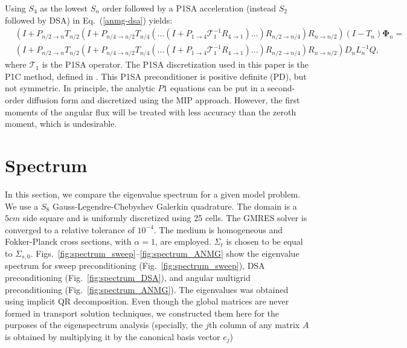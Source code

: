 \documentclass[preprint,10pt]{elsarticle}
\newcommand\bs{\boldsymbol}
\renewcommand{\(}{\left(}
\renewcommand{\)}{\right)}
\renewcommand{\[}{\left[}
\renewcommand{\]}{\right]}
\newcommand{\eqt}[1]{Eq.~(\ref{#1})}                     %
\newcommand{\fig}[1]{Fig.~\ref{#1}}                      %
\begin{document}
Using $S_4$ as the lowest $S_n$ order followed by a P1SA acceleration (instead $S_2$ followed by DSA) in 
\eqt{anmg-dsa} yields:
%
\begin{equation}
\begin{split}
& (I+P_{n/2\rightarrow n} T_{n/2} (I+P_{n/4\rightarrow n/2}
T_{n/4}(\hdots(I+P_{1\rightarrow 4}\mathcal{T}_1^{-1} R_{4\rightarrow
1})\hdots)R_{n/2 \rightarrow n/4})R_{n\rightarrow n/2}) (I-T_n)\bs{\Phi}_n = \\
& (I+P_{n/2\rightarrow n} T_{n/2} (I+P_{n/4\rightarrow n/2}
T_{n/4}(\hdots(I+P_{1\rightarrow 4}\mathcal{T}_1^{-1} R_{4\rightarrow
1})\hdots)R_{n/2\rightarrow n/4})R_{n\rightarrow n/2}) D_n L_n^{-1} Q ,
\end{split}
\end{equation}
%
where $\mathcal{T}_1$ is the P1SA operator. 
The P1SA discretization used in this paper is the P1C method, defined in \cite{yaqi}. 
This P1SA preconditioner is positive definite (PD), but not symmetric.  In principle, 
the analytic $P1$ equations can be put in a second-order diffusion form and discretized 
using the MIP approach.  However, the first moments of the angular flux will be treated with 
less accuracy than the zeroth moment, which is undesirable.  

\section{Spectrum} \label{sec:spectrum}
In this section, we compare the eigenvalue spectrum for a given model problem. We use a $S_8$
Gauss-Legendre-Chebyshev Galerkin quadrature. The domain is a $5cm$ side
square and is uniformly discretized using 25 cells. The GMRES solver is converged to a 
relative tolerance of $10^{-4}$. The medium is homogeneous and Fokker-Planck
cross sections, with $\alpha=1$, are employed. $\Sigma_t$ is chosen to be equal to
$\Sigma_{s,0}$. Figs.~\ref{fig:spectrum_sweep}--\ref{fig:spectrum_ANMG} show the eigenvalue spectrum
for sweep preconditioning (\fig{fig:spectrum_sweep}), DSA preconditioning (\fig{fig:spectrum_DSA}),
and angular multigrid preconditioning (\fig{fig:spectrum_ANMG}). The eigenvalues was obtained using 
implicit QR decomposition. Even though the global matrices are never formed in
transport solution techniques, we constructed them here for the purposes of the eigenspectrum analysis
(specially, the $j$th column of any matrix $A$ is obtained by multiplying it by the canonical basis vector
$e_j$)
\end{document}

